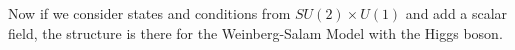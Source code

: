 %

Now if we consider states and conditions from $SU(2)\times U(1)$ and add a scalar field, the structure is there for the Weinberg-Salam Model with the Higgs boson. 

